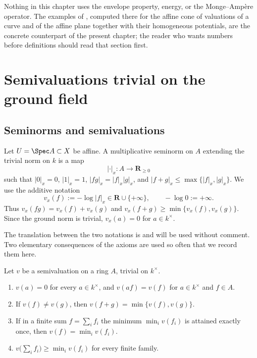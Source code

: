 Nothing in this chapter uses the envelope property, energy, or the
Monge--Amp\`ere operator.  The examples of ,
computed there for the affine cone of valuations of a curve and of the affine
plane together with their homogeneous potentials, are the concrete
counterpart of the present chapter; the reader who wants numbers before
definitions should read that section first.

\section{Semivaluations trivial on the ground field}
\label{sec:ch32-semivaluations}

\subsection{Seminorms and semivaluations}
\label{sec:ch32-seminorms}

Let $U=\Spec A\subset X$ be affine.  A multiplicative seminorm on $A$
extending the trivial norm on $k$ is a map
\[
 |\cdot|_x:A\longrightarrow \mathbf R_{\geq0}
\]
such that $|0|_x=0$, $|1|_x=1$,
$|fg|_x=|f|_x|g|_x$, and
$|f+g|_x\leq\max\{|f|_x,|g|_x\}$.  We use the additive notation
\begin{equation}
\label{eq:triv-additive-semivaluation}
             v_x(f):=-\log|f|_x\in\mathbf R\cup\{+\infty\},
             \qquad -\log0:=+\infty .
\end{equation}
Thus $v_x(fg)=v_x(f)+v_x(g)$ and
$v_x(f+g)\geq\min\{v_x(f),v_x(g)\}$.  Since the ground norm is
trivial, $v_x(a)=0$ for $a\in k^\times$.

The translation between the two notations is
 and will be used without
comment.  Two elementary consequences of the axioms are used so often that
we record them here.

\begin{lemma}
\label{lem:ch32-semivaluation-calculus}
Let $v$ be a semivaluation on a ring $A$, trivial on $k^\times$.
\begin{enumerate}
\item\label{itm:ch32-sc:units} $v(a)=0$ for every $a\in k^\times$, and
$v(af)=v(f)$ for $a\in k^\times$ and $f\in A$.
\item\label{itm:ch32-sc:strict} If $v(f)\neq v(g)$, then
$v(f+g)=\min\{v(f),v(g)\}$.
\item\label{itm:ch32-sc:unique} If in a finite sum $f=\sum_{i}f_i$ the
minimum $\min_iv(f_i)$ is attained exactly once, then
$v(f)=\min_iv(f_i)$.
\item\label{itm:ch32-sc:sum} $v\bigl(\sum_if_i\bigr)\geq\min_iv(f_i)$ for
every finite family.
\end{enumerate}
\end{lemma}


